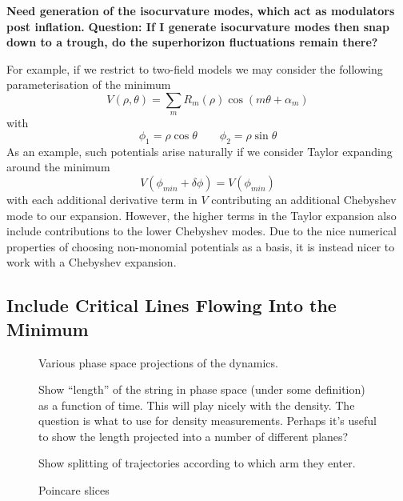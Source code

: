 \documentclass[11pt,a4paper]{article}
\begin{document}
{\bf Need generation of the isocurvature modes, which act as modulators post inflation.}
{\bf Question: If I generate isocurvature modes then snap down to a trough, do the superhorizon fluctuations remain there?}

For example, if we restrict to two-field models we may consider the following parameterisation of the minimum
\begin{equation}
  V(\rho,\theta) = \sum_{m} R_m(\rho)\cos(m\theta + \alpha_m)
\end{equation}
with
\begin{equation}
  \phi_1 = \rho\cos\theta \qquad \phi_2 = \rho\sin\theta
\end{equation}
As an example, such potentials arise naturally if we consider Taylor expanding around the minimum
\begin{equation}
  V(\phi_{min}+\delta\phi) = V(\phi_{min})
\end{equation}
with each additional derivative term in $V$ contributing an additional Chebyshev mode to our expansion.
However, the higher terms in the Taylor expansion also include contributions to the lower Chebyshev modes.
Due to the nice numerical properties of choosing non-monomial potentials as a basis, it is instead nicer to work with a Chebyshev expansion.

\subsection{Include Critical Lines Flowing Into the Minimum}

\begin{figure}
  \caption{Various phase space projections of the dynamics.}
\end{figure}

\begin{figure}
  \caption{Show ``length'' of the string in phase space (under some definition) as a function of time.  This will play nicely with the density.  The question is what to use for density measurements.  Perhaps it's useful to show the length projected into a number of different planes?}
\end{figure}

\begin{figure}
  \caption{Show splitting of trajectories according to which arm they enter.}
\end{figure}

\begin{figure}
  \caption{Poincare slices}
\end{figure}
\end{document}
